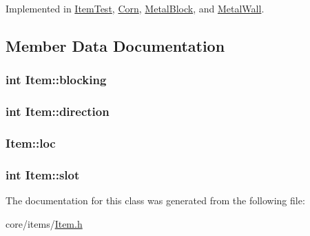 Implemented in \hyperlink{structItemTest_aa5a51547e6dacf11363e439222377b45}{Item\-Test}, \hyperlink{classCorn_ab9eee4022f2efe2142e987c3bed88a43}{Corn}, \hyperlink{classMetalBlock_a3eeed50e628c1b553fa145b0ff3aaa8a}{Metal\-Block}, and \hyperlink{classMetalWall_a1beefd8e4e1e8a12d0f0c97a0286722e}{Metal\-Wall}.



\subsection{Member Data Documentation}
\hypertarget{classItem_a5166900b24ba9e746a7ad34c00353cdd}{
\subsubsection[{blocking}]{\setlength{\rightskip}{0pt plus 5cm}int Item\-::blocking}}\label{classItem_a5166900b24ba9e746a7ad34c00353cdd}
\hypertarget{classItem_a1812b51dc93d2142c0641c536fbef617}{
\subsubsection[{direction}]{\setlength{\rightskip}{0pt plus 5cm}int Item\-::direction\hspace{0.3cm}{\ttfamily [protected]}}}\label{classItem_a1812b51dc93d2142c0641c536fbef617}
\hypertarget{classItem_ade907eeeea58df68fcacde1e5568779b}{
\subsubsection[{loc}]{ Item\-::loc}}\label{classItem_ade907eeeea58df68fcacde1e5568779b}
\hypertarget{classItem_adcfbfc3a87d2112c62b812dac2c72993}{
\subsubsection[{slot}]{\setlength{\rightskip}{0pt plus 5cm}int Item\-::slot}}\label{classItem_adcfbfc3a87d2112c62b812dac2c72993}


The documentation for this class was generated from the following file\-:\begin{DoxyCompactItemize}
\item 
core/items/\hyperlink{Item_8h}{Item.\-h}\end{DoxyCompactItemize}
